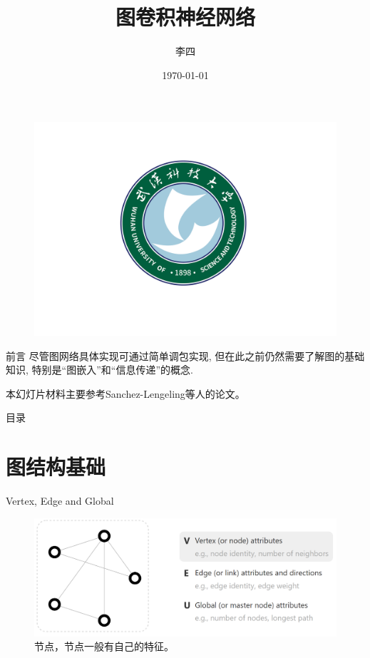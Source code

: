 \documentclass{beamer}
\author[Si Lee]{李四}
\title[Graph neural network]{图卷积神经网络}
\institute{武汉科技大学 \\ 理学院 \\ 重点实验室}
\date{\today}
\begin{document}
\songti %
\setsansfont{Times New Roman} %

\begin{frame}  %
    \titlepage
    \begin{figure}[htpb]
        \centering
        \vspace{-0.7cm}
        \includegraphics[width=0.45\linewidth]{wust.png}
    \end{figure}
\end{frame}

\begin{frame}{前言}
    尽管图网络具体实现可通过简单调包实现, 但在此之前仍然需要了解图的基础知识, 特别是``图嵌入''和``信息传递''的概念. \newline

    本幻灯片材料主要参考Sanchez-Lengeling\cite{sanchez-lengeling2021a}等人的论文。
\end{frame}

\begin{frame}{目录}\small
    \tableofcontents[subsectionstyle=hide]
\end{frame}

\AtBeginSubsection[]{
    \begin{frame}
        \tableofcontents[currentsubsection]
    \end{frame}
}

\section{图结构基础}


\begin{frame}{Vertex, Edge and Global}
    \begin{figure}
        \includegraphics[width=\textwidth]{vertex.png}
        \caption{节点，节点一般有自己的特征。}
    \end{figure}
\end{frame}
\end{document}

